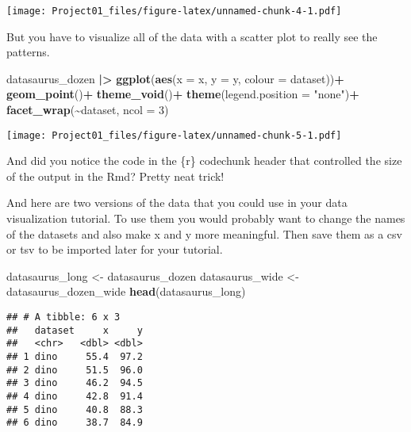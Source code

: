 \documentclass[
]{article}
\newenvironment{Shaded}{\begin{snugshade}}{\end{snugshade}}
\newcommand{\AttributeTok}[1]{\textcolor[rgb]{0.13,0.29,0.53}{#1}}
\newcommand{\DecValTok}[1]{\textcolor[rgb]{0.00,0.00,0.81}{#1}}
\newcommand{\FunctionTok}[1]{\textcolor[rgb]{0.13,0.29,0.53}{\textbf{#1}}}
\newcommand{\NormalTok}[1]{#1}
\newcommand{\OtherTok}[1]{\textcolor[rgb]{0.56,0.35,0.01}{#1}}
\newcommand{\SpecialCharTok}[1]{\textcolor[rgb]{0.81,0.36,0.00}{\textbf{#1}}}
\newcommand{\StringTok}[1]{\textcolor[rgb]{0.31,0.60,0.02}{#1}}
\begin{document}
\texttt{[image: Project01\_files/figure-latex/unnamed-chunk-4-1.pdf]}

But you have to visualize all of the data with a scatter plot to really
see the patterns.

\begin{Shaded}
\begin{Highlighting}[]
\NormalTok{datasaurus\_dozen }\SpecialCharTok{|\textgreater{}} 
  \FunctionTok{ggplot}\NormalTok{(}\FunctionTok{aes}\NormalTok{(}\AttributeTok{x =}\NormalTok{ x, }\AttributeTok{y =}\NormalTok{ y, }\AttributeTok{colour =}\NormalTok{ dataset))}\SpecialCharTok{+}
    \FunctionTok{geom\_point}\NormalTok{()}\SpecialCharTok{+}
    \FunctionTok{theme\_void}\NormalTok{()}\SpecialCharTok{+}
    \FunctionTok{theme}\NormalTok{(}\AttributeTok{legend.position =} \StringTok{"none"}\NormalTok{)}\SpecialCharTok{+}
    \FunctionTok{facet\_wrap}\NormalTok{(}\SpecialCharTok{\textasciitilde{}}\NormalTok{dataset, }\AttributeTok{ncol =} \DecValTok{3}\NormalTok{)}
\end{Highlighting}
\end{Shaded}

\texttt{[image: Project01\_files/figure-latex/unnamed-chunk-5-1.pdf]}

And did you notice the code in the \{r\} codechunk header that
controlled the size of the output in the Rmd? Pretty neat trick!

And here are two versions of the data that you could use in your data
visualization tutorial. To use them you would probably want to change
the names of the datasets and also make x and y more meaningful. Then
save them as a csv or tsv to be imported later for your tutorial.

\begin{Shaded}
\begin{Highlighting}[]
\NormalTok{datasaurus\_long }\OtherTok{\textless{}{-}}\NormalTok{ datasaurus\_dozen}
\NormalTok{datasaurus\_wide }\OtherTok{\textless{}{-}}\NormalTok{ datasaurus\_dozen\_wide}
\FunctionTok{head}\NormalTok{(datasaurus\_long)}
\end{Highlighting}
\end{Shaded}

\begin{verbatim}
## # A tibble: 6 x 3
##   dataset     x     y
##   <chr>   <dbl> <dbl>
## 1 dino     55.4  97.2
## 2 dino     51.5  96.0
## 3 dino     46.2  94.5
## 4 dino     42.8  91.4
## 5 dino     40.8  88.3
## 6 dino     38.7  84.9
\end{verbatim}
\end{document}
